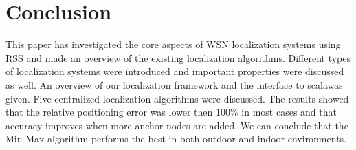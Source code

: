 \section{Conclusion}
This paper has investigated the core aspects of WSN localization systems using RSS and made an overview of the existing localization algorithms. Different types of localization systems were introduced and important properties were discussed as well. An overview of our localization framework and the interface to scalawas given. Five centralized localization algorithms were discussed. The results showed that the relative positioning error was lower then 100\% in most cases and that accuracy improves when more anchor nodes are added. We can conclude that the Min-Max algorithm performs the best in both outdoor and indoor environments.